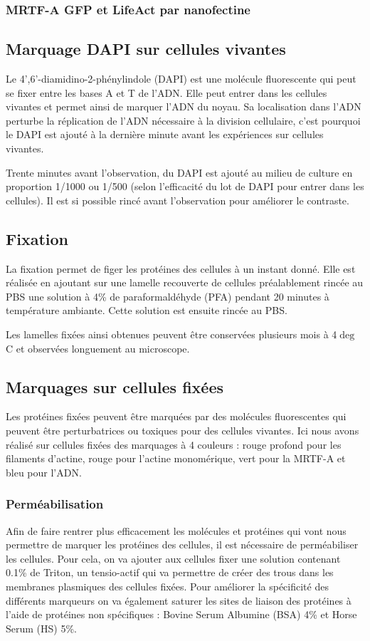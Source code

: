 \documentclass{report}
\begin{document}
		\subsubsection{MRTF-A GFP et LifeAct par nanofectine}
	\subsection{Marquage DAPI sur cellules vivantes}
	
	Le  4',6'-diamidino-2-phénylindole (DAPI) est une molécule fluorescente qui peut se fixer entre les bases A et T de l'ADN. Elle peut entrer dans les cellules vivantes et permet ainsi de marquer l'ADN du noyau. Sa localisation dans l'ADN perturbe la réplication de l'ADN nécessaire à la division cellulaire, c'est pourquoi le DAPI est ajouté à la dernière minute avant les expériences sur cellules vivantes. 
	
	Trente minutes avant l'observation, du DAPI est ajouté au milieu de culture en proportion 1/1000 ou 1/500 (selon l'efficacité du lot de DAPI pour entrer dans les cellules). Il est si possible rincé avant l'observation pour améliorer le contraste. 
	\subsection{Fixation}
	La fixation permet de figer les protéines des cellules à un instant donné. Elle est réalisée en ajoutant sur une lamelle recouverte de cellules préalablement rincée au PBS une solution à 4\% de paraformaldéhyde (PFA) pendant 20 minutes à température ambiante. Cette solution est ensuite rincée au PBS. 
	
	Les lamelles fixées ainsi obtenues peuvent être conservées plusieurs mois à 4$\deg$ C et observées longuement au microscope. 
	\subsection{Marquages sur cellules fixées}
	Les protéines fixées peuvent être marquées par des molécules fluorescentes qui peuvent être perturbatrices ou toxiques pour des cellules vivantes. Ici nous avons réalisé sur cellules fixées des marquages à 4 couleurs : rouge profond pour les filaments d'actine, rouge pour l'actine monomérique, vert pour la MRTF-A et bleu pour l'ADN. 
		\subsubsection{Perméabilisation}
		Afin de faire rentrer plus efficacement les molécules et protéines qui vont nous permettre de marquer les protéines des cellules, il est nécessaire de perméabiliser les cellules. Pour cela, on va ajouter aux cellules fixer une solution contenant 0.1\% de Triton, un tensio-actif qui va permettre de créer des trous dans les membranes plasmiques des cellules fixées. 
		Pour améliorer la spécificité des différents marqueurs on va également saturer les sites de liaison des protéines à l'aide de protéines non spécifiques : Bovine Serum Albumine (BSA) 4\% et Horse Serum (HS) 5\%. 
		
\end{document}
